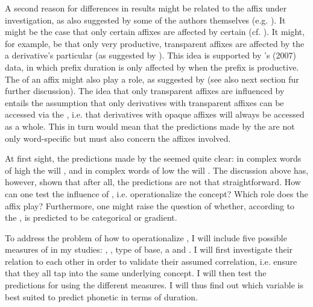{{%
A second reason for differences in results might be related to the affix under investigation, as also suggested by some of the authors themselves (e.g. \citealt{Hanique.2011,Schuppler.2012}). It might be the case that only certain affixes are affected by certain  (cf. \citealt{Collie.2008,Hanique.2011,Schuppler.2012}). It might, for example, be that only very productive, transparent affixes are affected by the a derivative's particular  (as suggested by \citealt{Hanique.2011}). This idea is supported by \citeauthor{Hay.2007}'s (2007) data, in which prefix duration is only affected by  when the prefix is productive. The  of an affix might also play a role, as suggested by \cite{Schuppler.2012} (see also next section fur further discussion). 
The idea that only transparent affixes are influenced by  entails the assumption that only derivatives with transparent affixes can be accessed via the ,  i.e. that derivatives with opaque affixes will always be accessed as a whole. This in turn would mean that the predictions made by the  are not only word-specific but must also concern the affixes involved.



At first sight, the predictions made by the  seemed quite clear: in complex words of high  the  will , and in complex words of low  the  will . The discussion above has, however, shown that after all, the predictions are not that straightforward.
 How can one test the influence of , i.e. operationalize the concept? Which role does the affix play? Furthermore, one might raise the question of whether, according to the ,  is predicted to be categorical or gradient. 




 To address the problem of how to operationalize , I will include five possible measures of  in my studies: , , type of base, a  and . I will first investigate their relation to each other in order to validate their assumed correlation, i.e. ensure that they all tap into the same underlying concept. I will then test the predictions for  using the different measures. I will thus find out which variable is best suited to predict phonetic  in terms of duration.



}}
